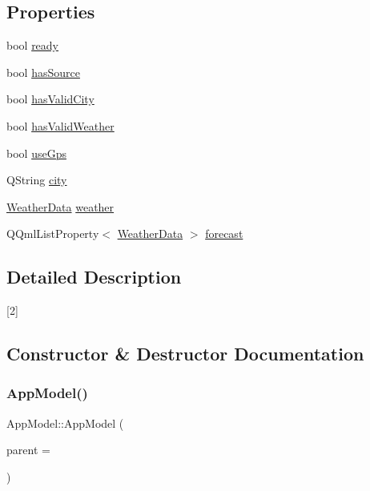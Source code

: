 \subsection*{Properties}
\begin{DoxyCompactItemize}
\item 
bool \hyperlink{class_app_model_a2af4f584bf701bff4546e889c16316d7}{ready}
\item 
bool \hyperlink{class_app_model_a2d25ce9151aea6a45cae797756a84445}{has\+Source}
\item 
bool \hyperlink{class_app_model_a98845ef5ffa3d9db0ee22aa3534b8608}{has\+Valid\+City}
\item 
bool \hyperlink{class_app_model_a493654987603c091935810e34e6b5c05}{has\+Valid\+Weather}
\item 
bool \hyperlink{class_app_model_aac827e2dce65eb299d4eec5ff4ab2155}{use\+Gps}
\item 
Q\+String \hyperlink{class_app_model_aa6915cabdaaf04805e00b5a2f75311e8}{city}
\item 
\hyperlink{class_weather_data}{Weather\+Data} \hyperlink{class_app_model_a72dfc16433c4ca50da689205e9db9298}{weather}
\item 
Q\+Qml\+List\+Property$<$ \hyperlink{class_weather_data}{Weather\+Data} $>$ \hyperlink{class_app_model_a3e45f56df91b1ad6d27c02c4ab1ad3c3}{forecast}
\end{DoxyCompactItemize}


\subsection{Detailed Description}
\mbox{[}2\mbox{]} 

\subsection{Constructor \& Destructor Documentation}
\mbox{\label{class_app_model_affb3ea459bceb0650cdc810f3f5a2256}} 
\subsubsection{\texorpdfstring{App\+Model()}{AppModel()}}
{\footnotesize\ttfamily App\+Model\+::\+App\+Model (\begin{DoxyParamCaption}\item[{Q\+Object $\ast$}]{parent = {} }\end{DoxyParamCaption})\hspace{0.3cm}{\ttfamily [explicit]}}




